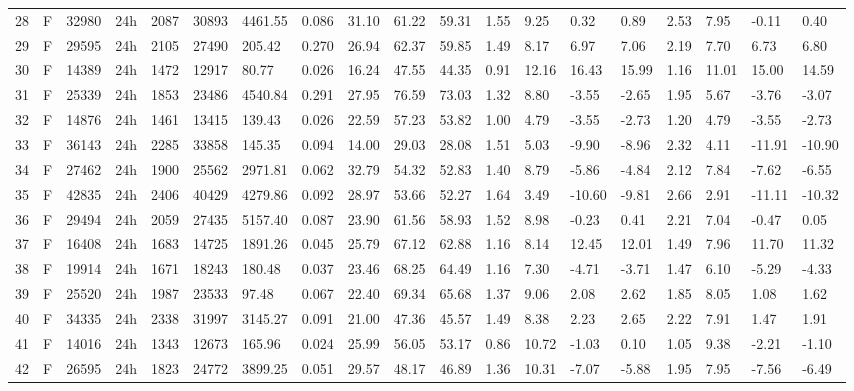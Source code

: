 \begin{tabular}{rllllllrlllllllllll}
28 & F & 32980 & 24h & 2087 & 30893 & 4461.55 & 0.086 & 31.10 & 61.22 & 59.31 & 1.55 & 9.25 & 0.32 & 0.89 & 2.53 & 7.95 & -0.11 & 0.40 \\
29 & F & 29595 & 24h & 2105 & 27490 & 205.42 & 0.270 & 26.94 & 62.37 & 59.85 & 1.49 & 8.17 & 6.97 & 7.06 & 2.19 & 7.70 & 6.73 & 6.80 \\
30 & F & 14389 & 24h & 1472 & 12917 & 80.77 & 0.026 & 16.24 & 47.55 & 44.35 & 0.91 & 12.16 & 16.43 & 15.99 & 1.16 & 11.01 & 15.00 & 14.59 \\
31 & F & 25339 & 24h & 1853 & 23486 & 4540.84 & 0.291 & 27.95 & 76.59 & 73.03 & 1.32 & 8.80 & -3.55 & -2.65 & 1.95 & 5.67 & -3.76 & -3.07 \\
32 & F & 14876 & 24h & 1461 & 13415 & 139.43 & 0.026 & 22.59 & 57.23 & 53.82 & 1.00 & 4.79 & -3.55 & -2.73 & 1.20 & 4.79 & -3.55 & -2.73 \\
33 & F & 36143 & 24h & 2285 & 33858 & 145.35 & 0.094 & 14.00 & 29.03 & 28.08 & 1.51 & 5.03 & -9.90 & -8.96 & 2.32 & 4.11 & -11.91 & -10.90 \\
34 & F & 27462 & 24h & 1900 & 25562 & 2971.81 & 0.062 & 32.79 & 54.32 & 52.83 & 1.40 & 8.79 & -5.86 & -4.84 & 2.12 & 7.84 & -7.62 & -6.55 \\
35 & F & 42835 & 24h & 2406 & 40429 & 4279.86 & 0.092 & 28.97 & 53.66 & 52.27 & 1.64 & 3.49 & -10.60 & -9.81 & 2.66 & 2.91 & -11.11 & -10.32 \\
36 & F & 29494 & 24h & 2059 & 27435 & 5157.40 & 0.087 & 23.90 & 61.56 & 58.93 & 1.52 & 8.98 & -0.23 & 0.41 & 2.21 & 7.04 & -0.47 & 0.05 \\
37 & F & 16408 & 24h & 1683 & 14725 & 1891.26 & 0.045 & 25.79 & 67.12 & 62.88 & 1.16 & 8.14 & 12.45 & 12.01 & 1.49 & 7.96 & 11.70 & 11.32 \\
38 & F & 19914 & 24h & 1671 & 18243 & 180.48 & 0.037 & 23.46 & 68.25 & 64.49 & 1.16 & 7.30 & -4.71 & -3.71 & 1.47 & 6.10 & -5.29 & -4.33 \\
39 & F & 25520 & 24h & 1987 & 23533 & 97.48 & 0.067 & 22.40 & 69.34 & 65.68 & 1.37 & 9.06 & 2.08 & 2.62 & 1.85 & 8.05 & 1.08 & 1.62 \\
40 & F & 34335 & 24h & 2338 & 31997 & 3145.27 & 0.091 & 21.00 & 47.36 & 45.57 & 1.49 & 8.38 & 2.23 & 2.65 & 2.22 & 7.91 & 1.47 & 1.91 \\
41 & F & 14016 & 24h & 1343 & 12673 & 165.96 & 0.024 & 25.99 & 56.05 & 53.17 & 0.86 & 10.72 & -1.03 & 0.10 & 1.05 & 9.38 & -2.21 & -1.10 \\
42 & F & 26595 & 24h & 1823 & 24772 & 3899.25 & 0.051 & 29.57 & 48.17 & 46.89 & 1.36 & 10.31 & -7.07 & -5.88 & 1.95 & 7.95 & -7.56 & -6.49 \\

\end{tabular}
